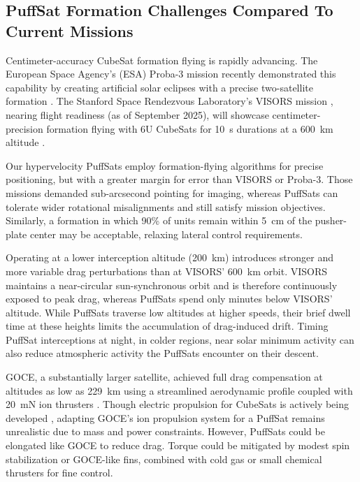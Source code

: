 \documentclass{article}
\begin{document}
\subsection{PuffSat Formation Challenges Compared To Current Missions}\label{sec:formation_challenges_current_missions}
Centimeter-accuracy CubeSat formation flying is rapidly advancing. The European Space Agency's (ESA) Proba-3 mission recently demonstrated this capability by creating artificial solar eclipses with a precise two-satellite formation \cite{esa_proba_3}. The Stanford Space Rendezvous Laboratory's VISORS mission \cite{guffanti2023autonomous}, nearing flight readiness (as of September 2025), will showcase centimeter-precision formation flying with 6U CubeSats for \SI{10}{\second} durations at a \SI{600}{\kilo\meter} altitude \cite{visors_formation_flying}.

Our hypervelocity PuffSats employ formation-flying algorithms for precise positioning, but with a greater margin for error than VISORS or Proba-3. Those missions demanded sub-arcsecond pointing for imaging, whereas PuffSats can tolerate wider rotational misalignments and still satisfy mission objectives. Similarly, a formation in which 90\% of units remain within \SI{5}{\centi\meter} of the pusher-plate center may be acceptable, relaxing lateral control requirements.

Operating at a lower interception altitude (\SI{200}{\kilo\meter}) introduces stronger and more variable drag perturbations than at VISORS' \SI{600}{\kilo\meter} orbit. VISORS maintains a near-circular sun-synchronous orbit and is therefore continuously exposed to peak drag, whereas PuffSats spend only minutes below VISORS' altitude. While PuffSats traverse low altitudes at higher speeds, their brief dwell time at these heights limits the accumulation of drag-induced drift.  Timing PuffSat interceptions at night, in colder regions, near solar minimum activity can also reduce atmospheric activity the PuffSats encounter on their descent.

GOCE, a substantially larger satellite, achieved full drag compensation at altitudes as low as  \SI{229}{\kilo\meter} using a streamlined aerodynamic profile coupled with \SI{20}{\milli\newton} ion thrusters \cite{goce_dragfree, goce_229km}. Though electric propulsion for CubeSats is actively being developed \cite{busek_iodine}, adapting GOCE's ion propulsion system for a PuffSat remains unrealistic due to mass and power constraints. However, PuffSats could be elongated like GOCE to reduce drag. Torque could be mitigated by modest spin stabilization or GOCE-like fins, combined with cold gas or small chemical thrusters for fine control.
\end{document}

